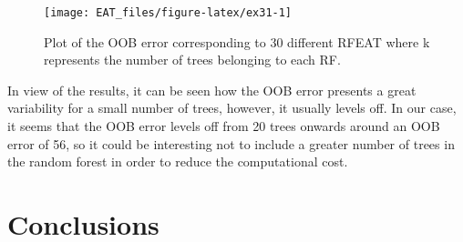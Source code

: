 \begin{Schunk}
\begin{figure}

{\centering \texttt{[image: EAT\_files/figure-latex/ex31-1]} 

}

\caption[Plot of the OOB error corresponding to 30 different RFEAT where k represents the number of trees belonging to each RF]{Plot of the OOB error corresponding to 30 different RFEAT where k represents the number of trees belonging to each RF.}\label{fig:ex31}
\end{figure}
\end{Schunk}

In view of the results, it can be seen how the OOB error presents a
great variability for a small number of trees, however, it usually
levels off. In our case, it seems that the OOB error levels off from 20
trees onwards around an OOB error of 56, so it could be interesting not
to include a greater number of trees in the random forest in order to
reduce the computational cost.

\hypertarget{section7}{%
\section{Conclusions}\label{section7}}

